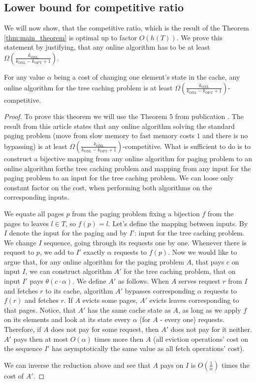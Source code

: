 \subsection{Lower bound for competitive ratio}
We will now show, that the competitive ratio, which is the result of the Theorem 
\ref{thm:main_theorem} is optimal up to factor $O(h(T))$. We prove this 
statement by justifying, that any online algorithm has to be at least 
$\Omega (\frac{k_{\mathrm{ONL}}}{k_{\mathrm{ONL}}- k_{\mathrm{OPT}} + 1})$.
\begin{theorem}
For any value $\alpha$ being a cost of changing one element's state in the cache, any 
online algorithm for the tree caching problem is at least $\Omega 
(\frac{k_{\mathrm{ONL}}}{k_{\mathrm{ONL}}- k_{\mathrm{OPT}} + 1})$-competitive.
\end{theorem}
\begin{proof}
To prove this theorem we will use the Theorem 5 from publication \cite{tarjan}. The 
result from this article states that any online algorithm solving the standard paging problem 
(move from slow memory to fast memory costs $1$ and there is no bypassing) is 
at least $\Omega(\frac{k_{\mathrm{ONL}}}{k_{\mathrm{ONL}}- k_{\mathrm{OPT}} + 
1})$-competitive. What is sufficient to do is to construct a bijective mapping from any 
online algorithm for paging problem to an online algorithm forthe tree caching problem and 
mapping from any input for the paging problem to an input for the tree caching 
problem. We can loose only constant factor on the cost, when performing both 
algorithms on the corresponding inputs.

We equate all pages $p$ from the paging problem fixing a bijection $f$ from the pages to leaves 
$l \in T$, so $f(p) = l$. Let's define the mapping between inputs. By $I$ 
denote the input for the paging and by $I'$: input for the tree caching problem. We 
change $I$ sequence, going through its requests one by one. Whenever there is 
request to $p$, we add to $I'$ exactly $\alpha$ requests to $f(p)$. Now we would 
like to argue that, for any online algorithm for the paging problem $A$, that pays 
$c$ on input $I$, we can construct algorithm $A'$ for the tree caching problem, that 
on input $I'$ pays $\theta(c \cdot \alpha)$. We define $A'$ as follows. 
When $A$ serves request $r$ from $I$ and fetches $r$ to its cache, algorithm 
$A'$ bypasses corresponding $\alpha$ requests to $f(r)$ and fetches $r$. If $A$ 
evicts some pages, $A'$ evicts leaves corresponding to that pages. Notice, that 
$A'$ has the 
same cache state as $A$, as long as we apply $f$ on its elements and look at its state 
every $\alpha$ (for $A$ - every one) requests. Therefore, if $A$ does not pay 
for some request, then $A'$ does not pay for it neither. $A'$ pays then at most 
$O(\alpha)$ times more then $A$ (all eviction operations' cost on the sequence 
$I'$ has asymptotically the same value as all fetch operations' cost).

We can inverse the reduction above and see that $A$ pays on $I$ is 
$O(\frac{1}{\alpha})$ times the cost of $A'$.    
\end{proof}
